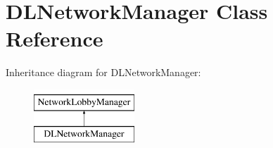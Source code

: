\hypertarget{class_d_l_network_manager}{}\section{D\+L\+Network\+Manager Class Reference}
\label{class_d_l_network_manager}
Inheritance diagram for D\+L\+Network\+Manager\+:\begin{figure}[H]
\begin{center}
\leavevmode
\includegraphics[height=2.000000cm]{class_d_l_network_manager}
\end{center}
\end{figure}
